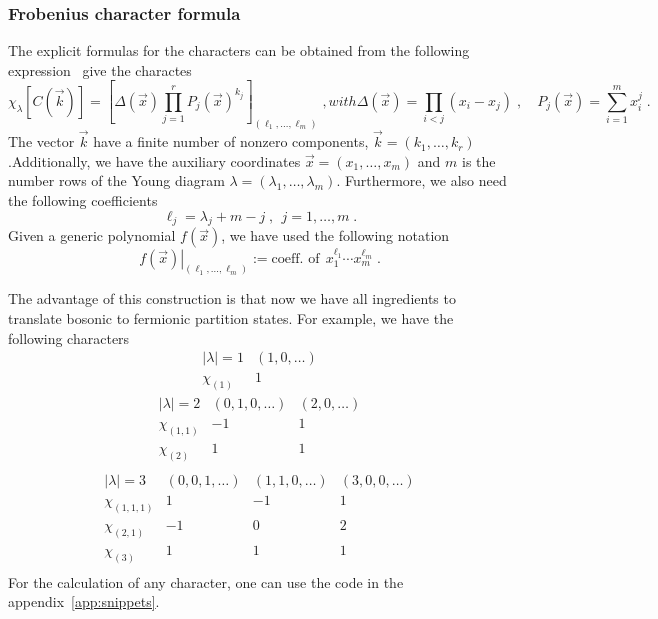\subsubsection{Frobenius character formula}
The explicit formulas for the characters can be obtained from the
following expression~\cite{Fulton:2004uyc} give the charactes
\begin{subequations}
\begin{equation}
\label{eq:frobenius}
\chi_{\lambda}[C(\vec{k})] = \left[ 
\Delta(\vec{x}) \prod_{j=1}^{r} P_j(\vec{x})^{k_j} 
\right]_{(\ell_1, \dots, \ell_m)}\; ,
\end{equation}
with
\begin{equation}
\Delta(\vec{x}) = \prod_{i<j}(x_i-x_j)\; , \quad P_j(\vec{x})=\sum_{i=1}^mx_i^j\; .
\end{equation}
\end{subequations}
The vector \(\vec{k}\) have a finite number of nonzero
components, \(\vec{k} = (k_1, \dots, k_r)\).Additionally, we have
the auxiliary coordinates \(\vec{x} = (x_1, \dots, x_m)\) and \(m\) is the
number rows of the Young diagram \(\lambda = (\lambda_1, \dots ,
\lambda_m)\). Furthermore, we also need the following coefficients
\begin{equation}
\ell_j = \lambda_j + m -j\; ,\ \ j=1,\dots, m\; .
\end{equation}
Given a generic polynomial \(f(\vec{x})\), we have used the following notation
 \begin{equation}
\left. f(\vec{x})\right|_{(\ell_1, \dots, \ell_m)}:=\text{coeff. of}
\ \ x_1^{\ell_1}\cdots x_m^{\ell_m}\; .
\end{equation}

The advantage of this construction is that now we have
all ingredients to translate bosonic to fermionic partition
states. For example, we have the following characters
\[
\begin{array}{cr} 
    |\lambda|  = 1 &
    (1,0,\dots)\\
    \hline \hline
    \chi_{(1)} & 1
\end{array}
\]
\[
\begin{array}{crr} 
    |\lambda| = 2 & (0,1,0,\dots) & (2,0,\dots) \\
    \hline\hline
    \chi_{(1,1)} & -1 & 1 \\ 
    \chi_{(2)} & 1 & 1 \\ 
\end{array}
\]
\[
\begin{array}{crrr} 
   |\lambda| = 3 & (0,0,1,\dots) &  (1,1,0,\dots) & (3,0,0,\dots) \\
  \hline \hline
    \chi_{(1,1,1)} & 1 & -1 & 1 \\ 
    \chi_{(2,1)} & -1 & 0 & 2 \\ 
    \chi_{(3)} & 1 & 1 & 1 \\ 
\end{array}
\]
For the calculation of any character, one can use the code in 
the appendix~\ref{app:snippets}.

